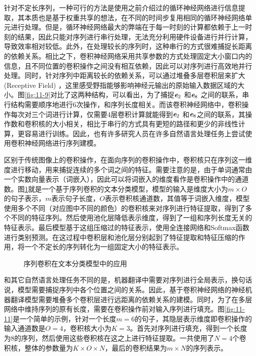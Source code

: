 \parinterval 针对不定长序列，一种可行的方法是使用之前介绍过的循环神经网络进行信息提取，其本质也是基于权重共享的想法，在不同的时间步复用相同的循环神经网络单元进行处理。但是，循环神经网络最大的弊端在于每一时刻的计算都依赖于上一时刻的结果，因此只能对序列进行串行处理，无法充分利用硬件设备进行并行计算，导致效率相对较低。此外，在处理较长的序列时，这种串行的方式很难捕捉长距离的依赖关系。相比之下，卷积神经网络采用共享参数的方式处理固定大小窗口内的信息，且不同位置的卷积操作之间没有相互依赖，因此可以对序列进行高效地并行处理。同时，针对序列中距离较长的依赖关系，可以通过堆叠多层卷积层来扩大{\small{}} (Receptive Field)  ，这里感受野指能够影响神经元输出的原始输入数据区域的大小。图\ref{fig:11-9}对比了这两种结构，可以看出，为了捕捉$\textbf{\em e}_2$ 和$\textbf{\em e}_8$ 之间的联系，串行结构需要顺序地进行6次操作，和序列长度相关。而该卷积神经网络中，卷积操作每次对三个词进行计算，仅需要4层卷积计算就能得到$\textbf{\em e}_2$ 和$\textbf{\em e}_8$之间的联系，其操作数和卷积核的大小相关，相比于串行的方式具有更短的路径和更少的非线性计算，更容易进行训练。因此，也有许多研究人员在许多自然语言处理任务上尝试使用卷积神经网络进行序列建模。

\parinterval 区别于传统图像上的卷积操作，在面向序列的卷积操作中，卷积核只在序列这一维度进行移动，用来捕捉连续的多个词之间的特征。需要注意的是，由于单词通常由一个实数向量表示（词嵌入），因此可以将词嵌入的维度看作是卷积操作中的通道数。图\ref{fig:11-10}就是一个基于序列卷积的文本分类模型，模型的输入是维度大小为$m\times O $的句子表示，$m$表示句子长度，$O$表示卷积核通道数，其值等于词嵌入维度，模型使用多个不同（对应图中不同的颜色）的卷积核来对序列进行特征提取，得到了多个不同的特征序列。然后使用池化层降低表示维度，得到了一组和序列长度无关的特征表示。最后模型基于这组压缩过的特征表示，使用全连接网络和Softmax函数进行类别预测。在这过程中卷积层和池化层分别起到了特征提取和特征压缩的作用，将一个不定长的序列转化为一组固定大小的特征表示。

\begin{figure}[htp]
\centering

\caption{序列卷积在文本分类模型中的应用}
\label{fig:11-10}
\end{figure}

\parinterval 和其它自然语言处理任务不同的是，机器翻译中需要对序列进行全局表示，换句话说，模型需要捕捉序列中各个位置之间的关系。因此，基于卷积神经网络的神经机器翻译模型需要堆叠多个卷积层进行远距离的依赖关系的建模。同时，为了在多层网络中维持序列的原有长度，需要在卷积操作前对输入序列进行填充。图\ref{fig:11-11}是一个简单的示例，针对一个长度$m=6$的句子，其隐层表示维度即卷积操作的输入通道数是$O=4$，卷积核大小为$K=3$。首先对序列进行填充，得到一个长度为8的序列，然后使用这些卷积核在这之上进行特征提取。一共使用了$N=4$个卷积核，整体的参数量为$K \times O \times N$，最后的卷积结果为$m \times N$的序列表示。

